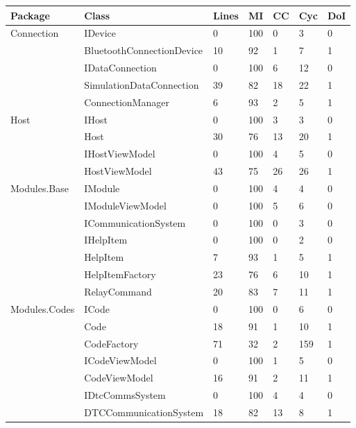 {{\begin{table}[ht]
\begin{scriptsize}
\begin{center}
\begin{tabularx}{\textwidth}{| l | X | l | l | l | l | l |}
				\hline
				\textbf{Package} & \textbf{Class} & \textbf{Lines} & \textbf{MI} & \textbf{CC} & \textbf{Cyc} & \textbf{DoI}\\
				\hline
				\multirow{5}{*}{Connection} & IDevice & 0 & 100 & 0 & 3 & 0\\\cline{2-7}
											& BluetoothConnectionDevice & 10 & 92 & 1 & 7 & 1\\\cline{2-7}
											& IDataConnection & 0 & 100 & 6 & 12 & 0\\\cline{2-7}					
											& SimulationDataConnection & 39 & 82 & 18 & 22 & 1\\\cline{2-7}
											& ConnectionManager & 6 & 93 & 2 & 5 & 1\\\cline{2-7}
				\hline
				\multirow{4}{*}{Host} & IHost & 0 & 100 & 3 & 3 & 0\\\cline{2-7}
									  & Host & 30 & 76 & 13 & 20 & 1\\\cline{2-7}
									  & IHostViewModel & 0 & 100 & 4 & 5 & 0\\\cline{2-7}
									  & HostViewModel & 43 & 75 & 26 & 26 & 1\\\cline{2-7}
				\hline
				\multirow{7}{*}{Modules.Base} & IModule & 0  & 100 & 4 & 4 & 0\\\cline{2-7}
									  		  & IModuleViewModel & 0  & 100 & 5 & 6 & 0\\\cline{2-7}
									  		  & ICommunicationSystem & 0  & 100 & 0 & 3 & 0\\\cline{2-7}
									  		  & IHelpItem & 0 & 100 & 0 & 2 & 0\\\cline{2-7}
									  		  & HelpItem & 7  & 93 & 1 & 5 & 1\\\cline{2-7}
									  		  & HelpItemFactory & 23 & 76 & 6 & 10 & 1\\\cline{2-7}
									  		  & RelayCommand & 20 & 83 & 7 & 11 & 1\\\cline{2-7}
				\hline
				\multirow{11}{*}{Modules.Codes} & ICode & 0 & 100 & 0 & 6 & 0\\\cline{2-7}
											    & Code & 18 & 91 & 1 & 10 & 1\\\cline{2-7}
											    & CodeFactory & 71 & 32 & 2 & 159 & 1\\\cline{2-7}
											    & ICodeViewModel & 0 & 100 & 1 & 5 & 0\\\cline{2-7}
											    & CodeViewModel & 16 & 91 & 2 & 11 & 1\\\cline{2-7}
											    & IDtcCommsSystem & 0 & 100 & 4 & 4 & 0\\\cline{2-7}
											    & DTCCommunicationSystem & 18  & 82 & 13 & 8 & 1\\\cline{2-7}

\end{tabularx}
\end{center}
\end{scriptsize}
\end{table}}}
